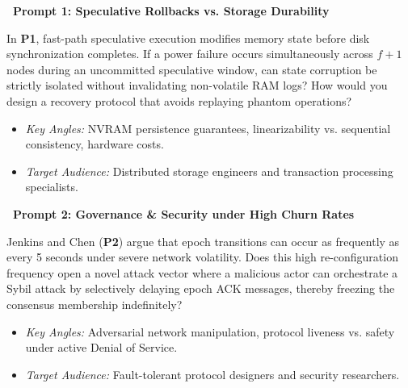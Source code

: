 \documentclass[11pt, a4paper, english]{scrartcl}
\begin{document}
\begin{tcolorbox}[promptbox]
\sffamily
\textbf{\color{NavyBlue}\faQuestionCircle\ Prompt 1: Speculative Rollbacks vs. Storage Durability}
\smallskip

In \textbf{\lbrack P1\rbrack}, fast-path speculative execution modifies memory state before disk synchronization completes. If a power failure occurs simultaneously across $f+1$ nodes during an uncommitted speculative window, can state corruption be strictly isolated without invalidating non-volatile RAM logs? How would you design a recovery protocol that avoids replaying phantom operations?

\begin{itemize}[label={\color{TealAccent}\small\faAngleRight}, leftmargin=1.2em, itemsep=2pt]
  \item \emph{Key Angles:} NVRAM persistence guarantees, linearizability vs. sequential consistency, hardware costs.
  \item \emph{Target Audience:} Distributed storage engineers and transaction processing specialists.
\end{itemize}
\end{tcolorbox}

\vspace{0.4em}

\begin{tcolorbox}[promptbox]
\sffamily
\textbf{\color{NavyBlue}\faQuestionCircle\ Prompt 2: Governance \& Security under High Churn Rates}
\smallskip

Jenkins and Chen (\textbf{\lbrack P2\rbrack}) argue that epoch transitions can occur as frequently as every 5 seconds under severe network volatility. Does this high re-configuration frequency open a novel attack vector where a malicious actor can orchestrate a Sybil attack by selectively delaying epoch ACK messages, thereby freezing the consensus membership indefinitely?

\begin{itemize}[label={\color{TealAccent}\small\faAngleRight}, leftmargin=1.2em, itemsep=2pt]
  \item \emph{Key Angles:} Adversarial network manipulation, protocol liveness vs. safety under active Denial of Service.
  \item \emph{Target Audience:} Fault-tolerant protocol designers and security researchers.
\end{itemize}
\end{tcolorbox}

\vspace{0.4em}
\end{document}

